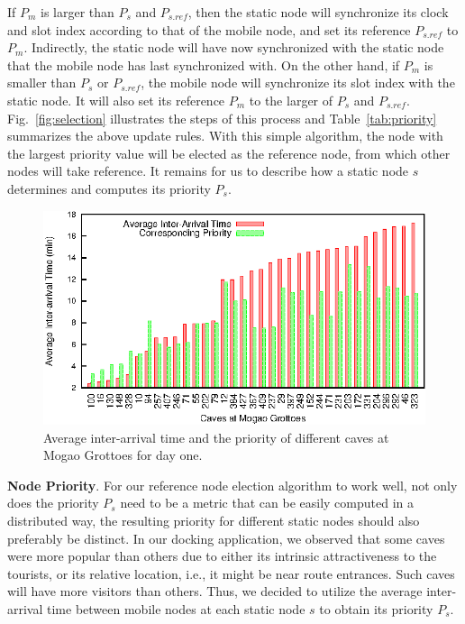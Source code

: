 \documentclass[twoside,twocolumn]{article}
\begin{document}
If $P_m$ is larger than $P_s$ and $P_{s.ref}$, then the static node
will synchronize its clock and slot index according to that of the
mobile node, and set its reference $P_{s.ref}$ to $P_m$. Indirectly,
the static node will have now synchronized with the static node that
the mobile node has last synchronized with. On the other hand, if
$P_m$ is smaller than $P_s$ or $P_{s.ref}$, the mobile node will
synchronize its slot index with the static node.  It will also
set its reference $P_m$ to the larger of $P_s$ and $P_{s.ref}$.
Fig.~\ref{fig:selection} illustrates the steps of this process and
Table~\ref{tab:priority} summarizes the above update rules. With this
simple algorithm, the node with the largest priority value will be
elected as the reference node, from which other nodes will take
reference.  It remains for us to describe how a static node $s$
determines and computes its priority $P_s$.

\begin{figure}[t]
   \centering
   \includegraphics[scale=0.7]{graphs/visiting_frequency/visitingfrequency}
   \caption{Average inter-arrival time and the priority of different
            caves at Mogao Grottoes for day one.}
   \label{fig:visitingfrequency}
\end{figure}

{\bf Node Priority}. For our reference node election algorithm to work
well, not only does the priority $P_s$ need to be a metric that can be
easily computed in a distributed way, the resulting priority for
different static nodes should also preferably be distinct. In our
docking application, we observed that some caves were more popular
than others due to either its intrinsic attractiveness to the
tourists, or its relative location, i.e., it might be near route
entrances. Such caves will have more visitors than others. Thus, we
decided to utilize the average inter-arrival time between mobile nodes
at each static node $s$ to obtain its priority $P_s$.
\end{document}
